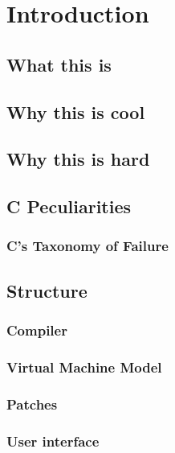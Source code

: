 \documentclass[a4paper]{report}
\begin{document}
\tableofcontents

\chapter{Introduction}

\section{What this is}

\section{Why this is cool}

\section{Why this is hard}

\section{C Peculiarities}
\subsection{C's Taxonomy of Failure}


\section{Structure}
\subsection{Compiler}
\subsection{Virtual Machine Model}
\subsection{Patches}
\subsection{User interface}






\appendix



\end{document}
